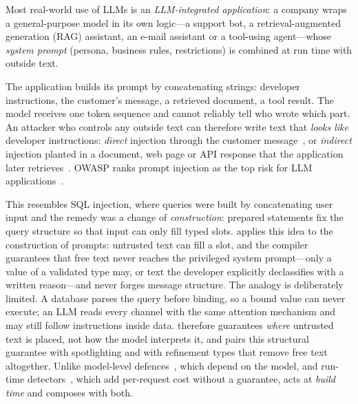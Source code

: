 \documentclass[conference]{IEEEtran}
\begin{document}
Most real-world use of LLMs is an \emph{LLM-integrated application}: a company wraps a general-purpose model in its own logic---a support bot, a retrieval-augmented generation (RAG) assistant, an e-mail assistant or a tool-using agent---whose \emph{system prompt} (persona, business rules, restrictions) is combined at run time with outside text.

The application builds its prompt by concatenating strings: developer instructions, the customer's message, a retrieved document, a tool result. The model receives one token sequence and cannot reliably tell who wrote which part. An attacker who controls any outside text can therefore write text that \emph{looks like} developer instructions: \emph{direct} injection through the customer message~\cite{perez2022ignore}, or \emph{indirect} injection planted in a document, web page or API response that the application later retrieves~\cite{greshake2023indirect}. OWASP ranks prompt injection as the top risk for LLM applications~\cite{owasp2025}.

This resembles SQL injection, where queries were built by concatenating user input and the remedy was a change of \emph{construction}: prepared statements fix the query structure so that input can only fill typed slots. \TL{} applies this idea to the construction of prompts: untrusted text can fill a slot, and the compiler guarantees that free text never reaches the privileged system prompt---only a value of a validated type may, or text the developer explicitly declassifies with a written reason---and never forges message structure. The analogy is deliberately limited. A database parses the query before binding, so a bound value can never execute; an LLM reads every channel with the same attention mechanism and may still follow instructions inside data. \TL{} therefore guarantees \emph{where} untrusted text is placed, not how the model interprets it, and pairs this structural guarantee with spotlighting and with refinement types that remove free text altogether. Unlike model-level defences~\cite{wallace2024hierarchy,chen2025struq,hines2024spotlighting}, which depend on the model, and run-time detectors~\cite{jacob2024promptshield,rebedea2023nemo}, which add per-request cost without a guarantee, \TL{} acts at \emph{build time} and composes with both.
\end{document}
